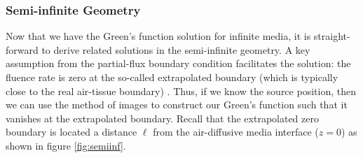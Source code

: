 \subsubsection{Semi-infinite Geometry}
Now that we have the Green's function solution for infinite media, it is straight-forward to derive related solutions in the semi-infinite geometry. A key assumption from the partial-flux boundary condition facilitates the solution: the fluence rate is zero at the so-called extrapolated boundary (which is typically close to the real air-tissue boundary) \cite{Haskell1994,Aronson1993,Aronson1995}. Thus, if we know the source position, then we can use the method of images to construct our Green's function such that it vanishes at the extrapolated boundary. Recall that the extrapolated zero boundary is located a distance $\ell$ from the air-diffusive media interface ($z=0$) as shown in figure \ref{fig:semiinf}. 

